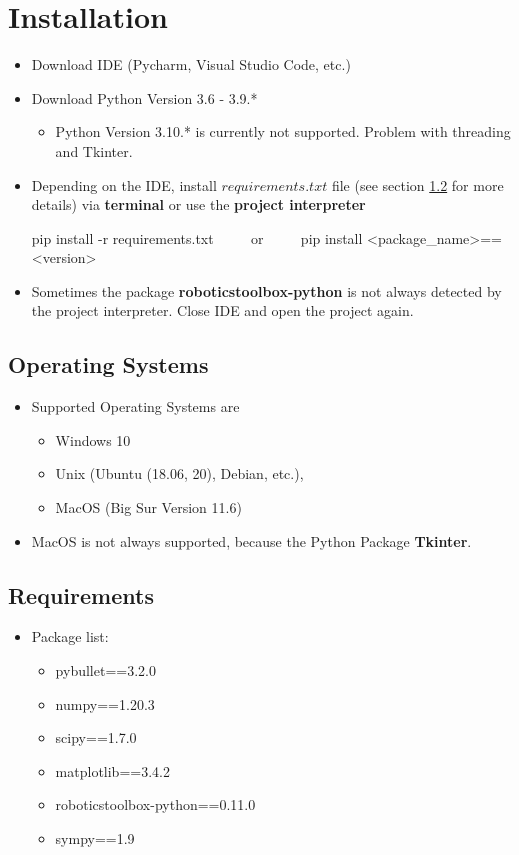 \documentclass[
	ngerman,
	accentcolor=9c,%
	type=intern,
	marginpar=false
	]{tudapub}
\begin{document}
\section{Installation}
\begin{itemize}
\item Download IDE (Pycharm, Visual Studio Code, etc.)
\item Download Python Version 3.6 - 3.9.*
\begin{itemize}
\item Python Version 3.10.* is currently not supported. Problem with threading and Tkinter. 
\end{itemize}
\vspace{.5cm}
\item Depending on the IDE, install $requirements.txt$ file (see section \ref{sec:requirement} for more details) via \textbf{terminal} or use the \textbf{project interpreter}
\begin{center}
pip install -r requirements.txt $\quad\quad$ or $\quad\quad$ pip install <package\_name>==<version> 
\end{center}
\item Sometimes the package \textbf{roboticstoolbox-python} is not always detected by the project interpreter. Close IDE and open the project again.
\end{itemize}

\subsection{Operating Systems}
\begin{itemize}
\item Supported Operating Systems are
\begin{itemize}
\item Windows 10
\item Unix (Ubuntu (18.06, 20), Debian, etc.),
\item MacOS (Big Sur Version 11.6)
\end{itemize}
\item MacOS is not always supported, because the Python Package \textbf{Tkinter}.
\end{itemize}

\subsection{Requirements}
\label{sec:requirement}
\begin{itemize}
\item Package list:
\begin{itemize}
\item pybullet==3.2.0
\item numpy==1.20.3
\item scipy==1.7.0
\item matplotlib==3.4.2
\item roboticstoolbox-python==0.11.0
\item sympy==1.9
\end{itemize}
\end{itemize}
\end{document}
